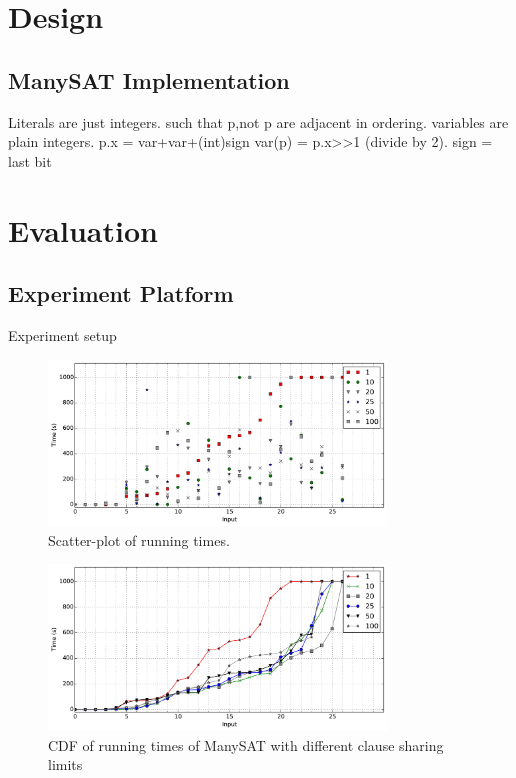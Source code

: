 \documentclass{article}
\begin{document}
\section{Design}

\subsection{ManySAT Implementation}

Literals are just integers. such that p,not p are adjacent in ordering. 
variables are plain integers. p.x = var+var+(int)sign
var(p) = p.x>>1 (divide by 2). sign = last bit 


\section{Evaluation}


\subsection{Experiment Platform}
Experiment setup

\begin{figure}[h]
  \centering
  \includegraphics[width=0.8\textwidth]{../figs/scatter_all.pdf}
  \caption{Scatter-plot of running times.}
  \label{fig:scatter-1}
\end{figure}


\begin{figure}[h]
  \centering
  \includegraphics[width=0.8\textwidth]{../figs/scatter_cdf.pdf}
  \caption{CDF of running times of ManySAT with different clause sharing limits}
  \label{fig:scatter-2}
\end{figure}
\end{document}
